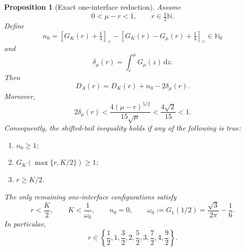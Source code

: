 \documentclass[11pt]{article}
\newtheorem{proposition}[theorem]{Proposition}
\theoremstyle{remark}
\newcommand{\N}{\mathbb N}
\newcommand{\sbr}[1]{[#1]_{<}}
\newcommand{\dd}{\,\mathrm d}
\begin{document}
\begin{proposition}[Exact one-interface reduction]
\label{prop:one-interface}
Assume
\[
 0<\mu-r<1,
 \qquad r\in\tfrac12\N.
\]
Define
\begin{equation}
 n_0=\sbr{G_K(r)+\tfrac14}
 -\sbr{G_K(r)-G_\mu(r)+\tfrac14}\in\N_0
 \label{eq:n0-def}
\end{equation}
and
\[
 \delta_\mu(r)=\int_r^\mu G_\mu(z)\dd z.
\]
Then
\begin{equation}
 \boxed{D_A(r)=D_K(r)+n_0-2\delta_\mu(r).}
 \label{eq:one-interface-identity}
\end{equation}
Moreover,
\begin{equation}
 2\delta_\mu(r)
 <\frac{4(\mu-r)^{5/2}}{15\sqrt\mu}
 <\frac{4\sqrt2}{15}<1.
 \label{eq:cap-bound}
\end{equation}
Consequently, the shifted-tail inequality holds if any of the following is
true:
\begin{enumerate}
 \item $n_0\geq1$;
 \item $G_K(\max\{r,K/2\})\geq1$;
 \item $r\geq K/2$.
\end{enumerate}
The only remaining one-interface configurations satisfy
\begin{equation}
 \boxed{
 r<\frac K2,\qquad
 K<\frac1{\omega_0},\qquad
 n_0=0,\qquad
 \omega_0:=G_1(1/2)=\frac{\sqrt3}{2\pi}-\frac16.}
 \label{eq:one-interface-residual}
\end{equation}
In particular,
\[
 r\in\left\{\frac12,1,\frac32,2,\frac52,3,\frac72,4,\frac92\right\}.
\]
\end{proposition}
\end{document}
